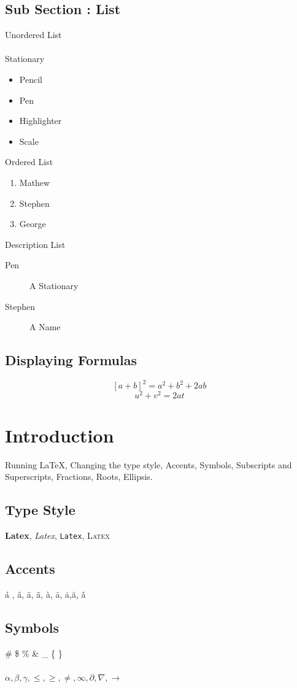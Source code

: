 \documentclass{article}
\begin{document}
\subsection{Sub Section : List}
Unordered List 
\\ \\ 
Stationary
\begin{itemize}
    \item Pencil
    \item Pen
    \item Highlighter
    \item Scale
\end{itemize}
Ordered List
\begin{enumerate}
    \item Mathew
    \item Stephen
    \item George
\end{enumerate}
Description List
\begin{description}
    \item[Pen] A Stationary
    \item[Stephen] A Name
\end{description}

\subsection{Displaying Formulas}
\[
[a + b]^2 =a^2 + b^2 + 2ab 
\]
\[
u^2 + v^2 = 2at 
\]
\section{Introduction}
Running LaTeX, Changing the type style, Accents, Symbols, Subscripts and Superscripts, Fractions, Roots, Ellipsis. 
\subsection{Type Style}
\textbf{Latex},
\textit{Latex},
\texttt{Latex},
\textsc{Latex}

\subsection{Accents}
\'a , \^a, \"a, \~a, \`a, \=a, \.a,\u{a}, \v{a}

\subsection{Symbols}
\#  \$  \%  \&  \_  \{  \}
\\ \\
$\alpha, \beta, \gamma, \leq, \geq, \neq, \infty, \partial, \nabla,\to$
\end{document}
